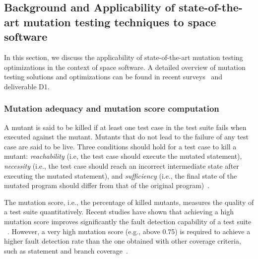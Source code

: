 
\subsection{Background and Applicability of state-of-the-art mutation testing techniques to space software}
\label{sec:background}

In this section, we discuss the applicability of state-of-the-art mutation testing optimizations in the context of space software. A detailed overview of mutation testing solutions and optimizations can be found in recent surveys~\cite{jia2010analysis,papadakis2019mutation} and deliverable D1.

\subsubsection{Mutation adequacy and mutation score computation}
\label{background:adequacy}
A mutant is said to be killed if at least one test case in the test suite fails when executed against the mutant.
Mutants that do not lead to the failure of any test case are said to be live.
Three conditions should hold for a test case to kill a mutant: \emph{reachability} (i.e, the test case should execute the mutated statement), \emph{necessity} (i.e., the test case should reach an incorrect intermediate state after executing the mutated statement), and \emph{sufficiency} (i.e., the final state of the mutated program should differ from that of the original program)~\cite{offutt1997automatically}.

The mutation score, i.e., the percentage of killed mutants, measures the quality of a test suite quantitatively. Recent studies have shown that achieving a high mutation score improves significantly the fault detection capability of a test suite
~\cite{papadakis2018mutation}. 
However, a very high mutation score (e.g., above 0.75) is required to achieve a higher fault detection rate than the one obtained with other coverage criteria, such as statement and branch coverage~\cite{Chekam:17}.

